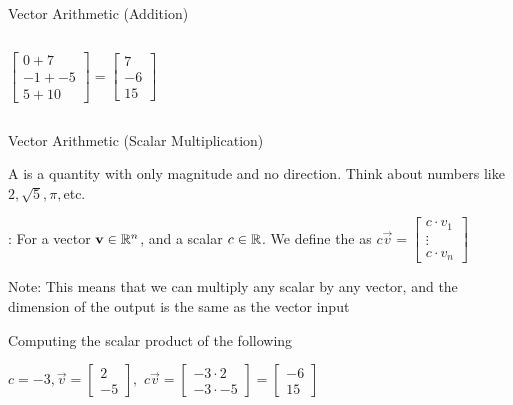\documentclass[xcoler=dvipsnames, aspectratio=169]{beamer}
\begin{document}
\begin{frame}{Vector Arithmetic (Addition)}
\begin{example}
\begin{columns}
\[\begin{bmatrix}
                                0+7 \\
                                -1 + -5\\
                                5 + 10
                            \end{bmatrix} = \begin{bmatrix}
                                7\\-6\\15
                            \end{bmatrix}
                        \]
            \end{columns}
        \end{example}
    \end{frame}
    \begin{frame}{Vector Arithmetic (Scalar Multiplication)}
        \scriptsize
        \begin{defn}
            A  is a quantity with only magnitude and no direction. Think about numbers like $2,\sqrt{5},\pi,$etc.
        \end{defn}
        \pause
        \begin{defn}
            : For a vector $\mathbf{v}\in\mathbb{R}^n$, and a scalar $c\in\mathbb{R}$. We define the  as $c\vec{v} = \begin{bmatrix}
                c\cdot v_1\\
                \vdots\\
                c\cdot v_n
            \end{bmatrix}
            $
            \pause

            Note: This means that we can multiply any scalar by any vector, and the dimension of the output is the same as the vector input
        \end{defn}
        \pause
        \begin{example}
            Computing the scalar product of the following

                $c=-3, \vec{v} = \begin{bmatrix}
                    2\\-5
                \end{bmatrix},$
                \qquad\qquad\qquad\qquad\qquad
                $
                c\vec{v} = \begin{bmatrix}
                    -3\cdot 2\\-3\cdot -5
                \end{bmatrix} = 
                \begin{bmatrix}
                    -6\\15
                \end{bmatrix}
                $
        \end{example}

\end{frame}
\end{document}
